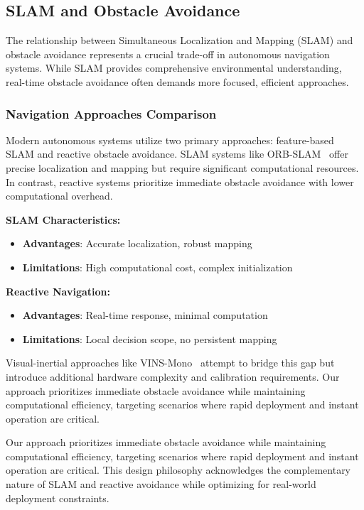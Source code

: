 \documentclass[12pt,oneside]{book}
\begin{document}
\subsection{SLAM and Obstacle Avoidance}

The relationship between Simultaneous Localization and Mapping (SLAM) and obstacle avoidance represents a crucial trade-off in autonomous navigation systems. While SLAM provides comprehensive environmental understanding, real-time obstacle avoidance often demands more focused, efficient approaches.

\subsubsection{Navigation Approaches Comparison}
Modern autonomous systems utilize two primary approaches: feature-based SLAM and reactive obstacle avoidance. SLAM systems like ORB-SLAM~\cite{mur2015orb} offer precise localization and mapping but require significant computational resources. In contrast, reactive systems prioritize immediate obstacle avoidance with lower computational overhead.

\textbf{SLAM Characteristics:}
\begin{itemize}
    \item \textbf{Advantages}: Accurate localization, robust mapping
    \item \textbf{Limitations}: High computational cost, complex initialization
\end{itemize}

\textbf{Reactive Navigation:}
\begin{itemize}
    \item \textbf{Advantages}: Real-time response, minimal computation
    \item \textbf{Limitations}: Local decision scope, no persistent mapping
\end{itemize}

Visual-inertial approaches like VINS-Mono~\cite{qin2018vins} attempt to bridge this gap but introduce additional hardware complexity and calibration requirements. Our approach prioritizes immediate obstacle avoidance while maintaining computational efficiency, targeting scenarios where rapid deployment and instant operation are critical.

Our approach prioritizes immediate obstacle avoidance while maintaining computational efficiency, targeting scenarios where rapid deployment and instant operation are critical. This design philosophy acknowledges the complementary nature of SLAM and reactive avoidance while optimizing for real-world deployment constraints.
\end{document}
